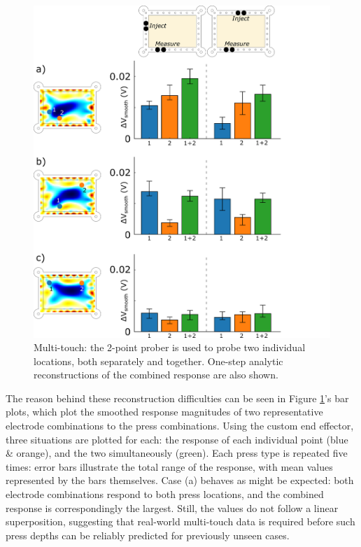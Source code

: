 \begin{figure}[htbp]
  \centering
  \includegraphics[width=\columnwidth]{Images/bitmap.png}
  \caption{Multi-touch: the 2-point prober is used to probe two individual locations, both separately and together. One-step analytic reconstructions of the combined response are also shown.}
  \label{fig:2point}
\end{figure}

The reason behind these reconstruction difficulties can be seen in Figure \ref{fig:2point}'s bar plots, which plot the smoothed response magnitudes of two representative electrode combinations to the press combinations. Using the custom end effector, three situations are plotted for each: the response of each individual point (blue \& orange), and the two simultaneously (green). Each press type is repeated five times: error bars illustrate the total range of the response, with mean values represented by the bars themselves. Case (a) behaves as might be expected: both electrode combinations respond to both press locations, and the combined response is correspondingly the largest. Still, the values do not follow a linear superposition, suggesting that real-world multi-touch data is required before such press depths can be reliably predicted for previously unseen cases. 

